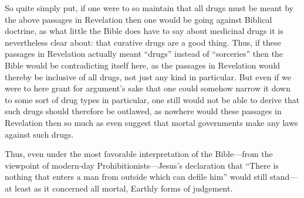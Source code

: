 \documentclass[letterpaper,12pt]{article}
\begin{document}
So quite simply put, if one were to so maintain that all drugs must be meant by the above passages in Revelation then one would be going against Biblical doctrine, as what little the Bible does have to say about medicinal drugs it is nevertheless clear about: that curative drugs are a good thing. Thus, if these passages in Revelation actually meant ``drugs'' instead of ``sorceries'' then the Bible would be contradicting itself here, as the passages in Revelation would thereby be inclusive of all drugs, not just any kind in particular. But even if we were to here grant for argument's sake that one could somehow narrow it down to some sort of drug types in particular, one still would not be able to derive that such drugs should therefore be outlawed, as nowhere would these passages in Revelation then so much as even suggest that mortal governments make any laws against such drugs.

Thus, even under the most favorable interpretation of the Bible---from the viewpoint of modern-day Prohibitionists---Jesus's declaration that ``There is nothing that enters a man from outside which can defile him'' would still stand---at least as it concerned all mortal, Earthly forms of judgement.
\end{document}

